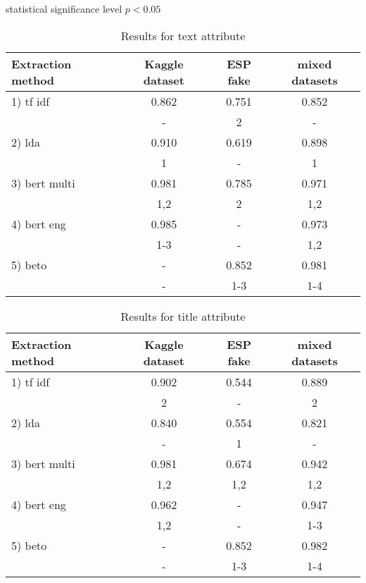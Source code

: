 \documentclass{article}
\begin{document}
statistical significance level $ p < 0.05 $


\begin{table}[]
    \centering
    \caption{Results for text attribute}

    \begin{tabular}{|l|c|c|c|}
    \hline
    Extraction method & Kaggle dataset & ESP fake & mixed datasets\\
    \hline
    1) tf idf     & 0.862         & 0.751           & 0.852 \\ 
                  & \small{-}     & \small{2}       & \small{-}   \\
    \hline
    2) lda        & 0.910         & 0.619           & 0.898 \\ 
                  & \small{1}     & \small{-}       & \small{1}     \\
    \hline
    3) bert multi & 0.981         & 0.785           & 0.971 \\
                  & \small{1,2}   & \small{2}       & \small{1,2}     \\
    \hline
    4) bert eng   & 0.985         & -              & 0.973 \\
                  & \small{1-3}   & \small{-}      & \small{1,2}   \\
    \hline
    5) beto       & -             & 0.852          & 0.981 \\
                  & \small{-}     &   \small{1-3}  & \small{1-4}     \\
    \hline
  \end{tabular}
    \label{tab:my_label}
\end{table}

\begin{table}[]
    \centering
    \caption{Results for title attribute}

    \begin{tabular}{|l|c|c|c|}
    \hline
    Extraction method & Kaggle dataset & ESP fake & mixed datasets\\
    \hline
    1) tf idf     & 0.902         & 0.544           & 0.889 \\ 
                  & \small{2}     & \small{-}       & \small{2}      \\
    \hline
    2) lda        & 0.840         & 0.554           & 0.821 \\ 
                  & \small{-}     &  \small{1}      & \small{-}     \\
    \hline
    3) bert multi & 0.981         & 0.674           & 0.942 \\
                  & \small{1,2}   &   \small{1,2}   & \small{1,2}     \\
    \hline
    4) bert eng   & 0.962         & -               & 0.947 \\
                  & \small{1,2}   & \small{-}       & \small{1-3}     \\
    \hline
    5) beto       & -             & 0.852           & 0.982 \\
                  & \small{-}     & \small{1-3}     & \small{1-4}     \\
    \hline
  \end{tabular}
    \label{tab:my_label}
\end{table}
\end{document}
